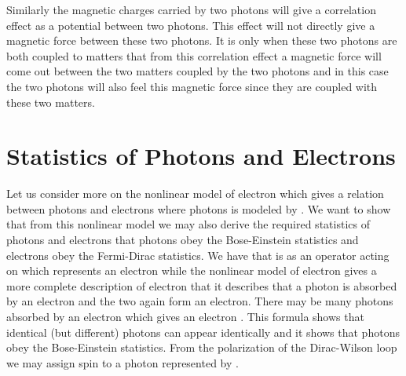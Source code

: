 \documentclass[a4paper,a4paper]{article}
\begin{document}
Similarly the magnetic charges carried by two photons will give a correlation effect as a potential between two photons. This effect will not directly give a magnetic force between these two photons. It is only when these two photons are both coupled to matters that from this correlation effect a magnetic force will come out between the two matters coupled by the two photons and in this case the two photons will also feel this magnetic force since they are coupled with these two matters.

\section{Statistics of Photons and Electrons}

Let us consider more on the nonlinear model of electron \coordHE{} which gives a relation between photons and electrons where photons is modeled by \coordHE{}. We want to show that from this nonlinear model we may also derive the required statistics of photons and electrons that photons obey the Bose-Einstein statistics and electrons obey the Fermi-Dirac statistics. We have that \coordHE{} is as an operator acting on \coordHE{} which represents an electron while the nonlinear model of electron \coordHE{} gives a more complete description of electron that it describes that a photon  \coordHE{} is absorbed by an electron and the two again form an electron. There may be many photons \coordHE{} absorbed by an electron which gives an electron \coordHE{}. This formula shows that identical (but different) photons can appear identically and it shows that photons obey the Bose-Einstein statistics. From the polarization of the Dirac-Wilson loop \coordHE{} we may assign spin \coordHE{} to a photon represented by \coordHE{}. 
\end{document}
